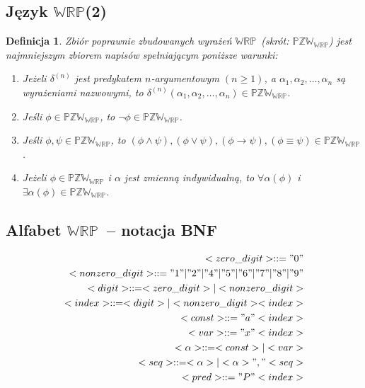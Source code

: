 \documentclass[12pt]{article}
\newtheorem{definicja}{Definicja}
\newcommand {\PZWWRP} {\ensuremath{\mathbb{PZW_{WRP}}}}
\newcommand {\WRP} {\ensuremath{\mathbb{WRP}}}
\begin{document}
\subsection{Język \WRP (2)}
%
\begin{definicja}
\label{PZWWRP}
Zbiór poprawnie zbudowanych wyrażeń \WRP~(skrót: \PZWWRP) jest najmniejszym zbiorem napisów spełniającym poniższe warunki:
%
\begin{enumerate}
\item Jeżeli $\delta^{(n)}$ jest predykatem $n$-argumentowym $(n \geq 1)$, a $\alpha_{1}, \alpha_{2}, \dots, \alpha_{n}$ są wyrażeniami nazwowymi, to $\delta^{(n)}(\alpha_{1}, \alpha_{2}, \dots, \alpha_{n}) \in \PZWWRP$.%
\item Jeśli $\phi \in \PZWWRP$, to $\neg \phi \in \PZWWRP$.
%
\item Jeśli $\phi, \psi \in \PZWWRP$, to $(\phi \land \psi), (\phi \lor \psi), (\phi \to \psi), (\phi \equiv \psi) \in \PZWWRP$.
%
\item Jeżeli $\phi \in \PZWWRP$ i $\alpha$ jest zmienną indywidualną, to $\forall \alpha (\phi)$ i $\exists \alpha (\phi) \in \PZWWRP$.
\end{enumerate}
\end{definicja}
%

\subsection{Alfabet \WRP\ -- notacja BNF}
%
\begin{eqnarray}
<zero\_digit> :: = "0" \\ %
<nonzero\_digit> :: = "1" | "2" | "4" | "5" | "6" | "7" | "8" | "9" \\ %
<digit> :: = <zero\_digit> | <nonzero\_digit> \\ %
<index> :: = <digit> | <nonzero\_digit><index> \\ %
<const> ::= "a"<index> \\ %
<var> ::= "x"<index> \\ %
<\alpha> ::= <const> | <var> \\ %
<seq> ::= <\alpha> | <\alpha>","<seq> \\ %
<pred> ::= "P"<index>
\end{eqnarray}
%
\end{document}

